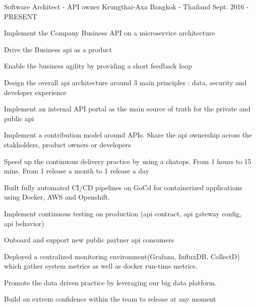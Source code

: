

\begin{cventries}

  \cventry
    {Software Architect - API owner} %
    {Krungthai-Axa} %
    {Bangkok - Thailand} %
    {Sept. 2016 - PRESENT} %
    {
      \begin{cvitems} %
        \item {Implement the Company Business API on a microservice architecture}
        \item {Drive the Business api as a product}
        \item {Enable the business agility by providing a short feedback loop}
        \item {Design the overall api architecture around 3 main principles : data, security and developer experience}
        \item {Implement an internal API portal as the main source of truth for the private and public api}
        \item {Implement a contribution model around APIs. Share the api ownership across the stakholders, product owners or developers}
        \item {Speed up the continuous delivery practice by using a chatops. From 1 hours to 15 mins. From 1 release a month to 1 release a day}
        \item {Built fully automated CI/CD pipelines on GoCd for containerized applications using Docker, AWS and Openshift.}
        \item {Implement continuous testing on production (api contract, api gateway config, api behavior)}
        \item {Onboard and support new public partner api consumers}
        \item {Deployed a centralized monitoring environment(Grafana, InfluxDB, CollectD) which gather system metrics as well as docker run-time metrics.}
        \item {Promote the data driven practice by leveraging our big data platform.}
        \item {Build an extrem confidence within the team to release at any moment}
      \end{cvitems}
    }


\end{cventries}
